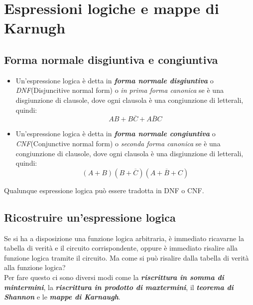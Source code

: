 \documentclass[12pt]{report}
\begin{document}
		\chapter{Espressioni logiche e mappe di Karnugh}
			\section{Forma normale disgiuntiva e congiuntiva}
			\begin{itemize}
				\item Un'espressione logica è detta in \textbf{\textit{forma normale disgiuntiva}} o \textit{DNF}(Disjuncitive normal form) o \textit{in prima forma canonica} se è una disgiunzione di clausole, dove ogni clausola è una congiunzione di letterali, quindi:
				\[
				AB + B\overline{C} + A\overline{B}C
				\]
				\item Un'espressione logica è detta in \textbf{\textit{forma normale congiuntiva}} o \textit{CNF}(Conjunctive normal form) o \textit{seconda forma canonica} se è una congiunzione di clausole, dove ogni clausola è una disgiunzione di letterali, quindi:
				\[
				(A + B)(B + \overline{C})(A + \overline{B} + C)
				\]
			\end{itemize}
			Qualunque espressione logica può essere tradotta in DNF o CNF.
			\section{Ricostruire un'espressione logica}
			Se si ha a disposizione una funzione logica arbitraria, è immediato ricavarne la tabella di verità e il circuito corrispondente, oppure è immediato risalire alla funzione logica tramite il circuito. Ma come si può risalire dalla tabella di verità alla funzione logica? \\
			Per fare questo ci sono diversi modi come la \textbf{\textit{ riscrittura in somma di mintermini}}, la \textbf{\textit{riscrittura in prodotto di maxtermini}}, il \textbf{\textit{teorema di Shannon}} e le \textbf{\textit{mappe di Karnaugh}}.
\end{document}

